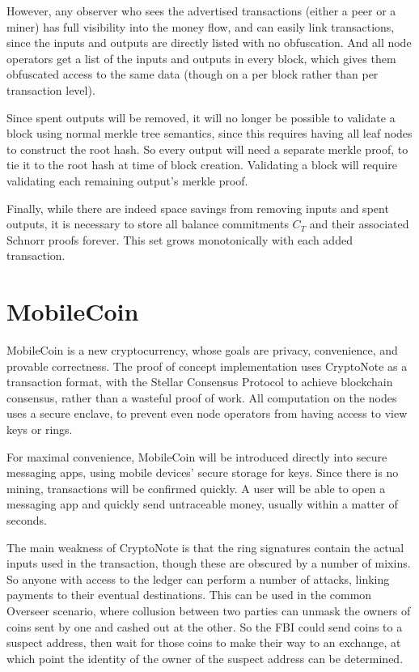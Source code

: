 \documentclass{article}
\begin{document}
However, any observer who sees the advertised transactions (either a peer or a miner) has full visibility into the money flow, and can easily link transactions, since the inputs and outputs are directly listed with no obfuscation.  And all node operators get a list of the inputs and outputs in every block, which gives them obfuscated access to the same data (though on a per block rather than per transaction level).

Since spent outputs will be removed, it will no longer be possible to validate a block using normal merkle tree semantics, since this requires having all leaf nodes to construct the root hash.  So every output will need a separate merkle proof, to tie it to the root hash at time of block creation.  Validating a block will require validating each remaining output's merkle proof.

Finally, while there are indeed space savings from removing inputs and spent outputs, it is necessary to store all balance commitments $C_T$ and their associated Schnorr proofs forever.  This set grows monotonically with each added transaction.  

\newpage
\section{MobileCoin}

MobileCoin is a new cryptocurrency, whose goals are privacy, convenience, and provable correctness.  The proof of concept implementation uses CryptoNote as a transaction format, with the Stellar Consensus Protocol to achieve blockchain consensus, rather than a wasteful proof of work.  All computation on the nodes uses a secure enclave, to prevent even node operators from having access to view keys or rings.  

For maximal convenience, MobileCoin will be introduced directly into secure messaging apps, using mobile devices' secure storage for keys.  Since there is no mining, transactions will be confirmed quickly.  A user will be able to open a messaging app and quickly send untraceable money, usually within a matter of seconds.

The main weakness of CryptoNote is that the ring signatures contain the actual inputs used in the transaction, though these are obscured by a number of mixins.  So anyone with access to the ledger can perform a number of attacks, linking payments to their eventual destinations.  This can be used in the common Overseer scenario, where collusion between two parties can unmask the owners of coins sent by one and cashed out at the other.  So the FBI could send coins to a suspect address, then wait for those coins to make their way to an exchange, at which point the identity of the owner of the suspect address can be determined.
\end{document}
